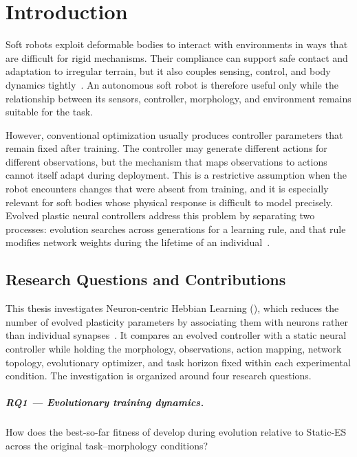 \chapter{Introduction}
\label{cha:introduction}

Soft robots exploit deformable bodies to interact with environments in ways that are difficult for rigid mechanisms. Their compliance can support safe contact and adaptation to irregular terrain, but it also couples sensing, control, and body dynamics tightly~\cite{rus2015softrobots}. An autonomous soft robot is therefore useful only while the relationship between its sensors, controller, morphology, and environment remains suitable for the task.

However, conventional optimization usually produces controller parameters that remain fixed after training. The controller may generate different actions for different observations, but the mechanism that maps observations to actions cannot itself adapt during deployment. This is a restrictive assumption when the robot encounters changes that were absent from training, and it is especially relevant for soft bodies whose physical response is difficult to model precisely. Evolved plastic neural controllers address this problem by separating two processes: evolution searches across generations for a learning rule, and that rule modifies network weights during the lifetime of an individual~\cite{soltoggio2018borntolearn}.

\section{Research Questions and Contributions}

This thesis investigates Neuron-centric Hebbian Learning (\nchl), which reduces the number of evolved plasticity parameters by associating them with neurons rather than individual synapses~\cite{ferigo2024nchl}. It compares an evolved \nchl{} controller with a static neural controller while holding the morphology, observations, action mapping, network topology, evolutionary optimizer, and task horizon fixed within each experimental condition. The investigation is organized around four research questions.

\paragraph{RQ1 --- Evolutionary training dynamics.}
How does the best-so-far fitness of \nchlcontroller{} develop during evolution relative to Static-ES across the original task--morphology conditions?

